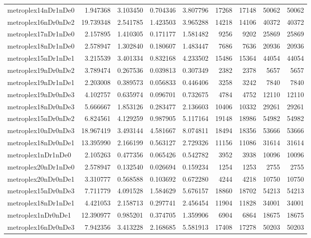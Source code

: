 \begin{longtable}{|l|r|r|r|r|r|r|r|r|}
metroplex14nDr1nDe0 & 1.947368 & 3.103450 & 0.704346 & 3.807796 & 17268 & 17148 & 50062 & 50062 \\
metroplex16nDr0nDe2 & 19.739348 & 2.541785 & 1.423503 & 3.965288 & 14218 & 14106 & 40372 & 40372 \\
metroplex17nDr1nDe0 & 2.157895 & 1.410305 & 0.171177 & 1.581482 & 9256 & 9202 & 25869 & 25869 \\
metroplex18nDr1nDe0 & 2.578947 & 1.302840 & 0.180607 & 1.483447 & 7686 & 7636 & 20936 & 20936 \\
metroplex15nDr1nDe1 & 3.215539 & 3.401334 & 0.832168 & 4.233502 & 15486 & 15364 & 44054 & 44054 \\
metroplex19nDr0nDe2 & 3.789474 & 0.267536 & 0.039813 & 0.307349 & 2382 & 2378 & 5657 & 5657 \\
metroplex19nDr1nDe1 & 2.203008 & 0.389573 & 0.056833 & 0.446406 & 3258 & 3242 & 7840 & 7840 \\
metroplex19nDr0nDe3 & 4.102757 & 0.635974 & 0.096701 & 0.732675 & 4784 & 4752 & 12110 & 12110 \\
metroplex18nDr0nDe3 & 5.666667 & 1.853126 & 0.283477 & 2.136603 & 10406 & 10332 & 29261 & 29261 \\
metroplex15nDr0nDe2 & 6.824561 & 4.129259 & 0.987905 & 5.117164 & 19148 & 18986 & 54982 & 54982 \\
metroplex10nDr0nDe3 & 18.967419 & 3.493144 & 4.581667 & 8.074811 & 18494 & 18356 & 53666 & 53666 \\
metroplex18nDr0nDe1 & 13.395990 & 2.166199 & 0.563127 & 2.729326 & 11156 & 11086 & 31614 & 31614 \\
metroplex1nDr1nDe0 & 2.105263 & 0.477356 & 0.065426 & 0.542782 & 3952 & 3938 & 10096 & 10096 \\
metroplex20nDr1nDe0 & 2.578947 & 0.132540 & 0.026694 & 0.159234 & 1254 & 1253 & 2755 & 2755 \\
metroplex20nDr0nDe1 & 3.310777 & 0.568588 & 0.103692 & 0.672280 & 4244 & 4218 & 10750 & 10750 \\
metroplex15nDr0nDe3 & 7.711779 & 4.091528 & 1.584629 & 5.676157 & 18860 & 18702 & 54213 & 54213 \\
metroplex18nDr1nDe1 & 4.421053 & 2.158713 & 0.297741 & 2.456454 & 11904 & 11828 & 34001 & 34001 \\
metroplex1nDr0nDe1 & 12.390977 & 0.985201 & 0.374705 & 1.359906 & 6904 & 6864 & 18675 & 18675 \\
metroplex16nDr0nDe3 & 7.942356 & 3.413228 & 2.168685 & 5.581913 & 17408 & 17278 & 50203 & 50203 \\

\end{longtable}
